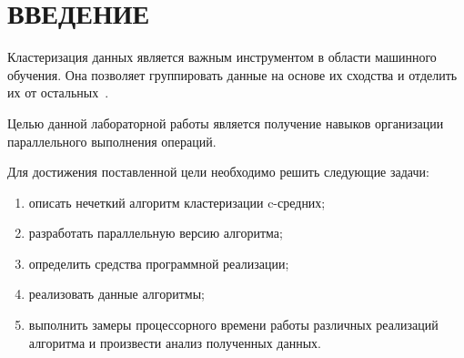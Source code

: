 \chapter*{ВВЕДЕНИЕ}

Кластеризация данных является важным инструментом в области машинного обучения.
Она позволяет группировать данные на основе их сходства и отделить их от остальных~\cite{inro-clust}. 

Целью данной лабораторной работы является получение навыков организации параллельного выполнения операций.

Для достижения поставленной цели необходимо решить следующие задачи:
\begin{enumerate}[label={\arabic*)}]
    \item описать нечеткий алгоритм кластеризации c-средних;
    \item разработать параллельную версию алгоритма;
    \item определить средства программной реализации;
    \item реализовать данные алгоритмы;
    \item выполнить замеры процессорного времени работы различных реализаций алгоритма и произвести анализ полученных данных.
\end{enumerate}